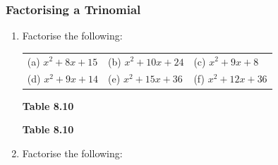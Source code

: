             \subsubsection{  Factorising a Trinomial }
            \nopagebreak
        \label{m39394*id277570}\begin{enumerate}[noitemsep, label=\textbf{\arabic*}. ] 
            \label{m39394*uid30}\item Factorise the following:
          \begin{table}[H]
        \begin{center}
      \label{m39394*id277586}
    \noindent
      \tablelasttail{}
      \begin{xtabular}[t]{|l|l|l|}\hline
        (a) ${x}^{2}+8x+15$\hspace{1ex} &
        (b) ${x}^{2}+10x+24$\hspace{1ex} &
        (c) ${x}^{2}+9x+8$\hspace{1ex}%
     \tabularnewline{}
        (d) ${x}^{2}+9x+14$\hspace{1ex} &
        (e) ${x}^{2}+15x+36$\hspace{1ex} &
        (f) ${x}^{2}+12x+36$\hspace{1ex}%
     \tabularnewline{}
    \end{xtabular}
      \end{center}
    \begin{center}{\small\bfseries Table 8.10}\end{center}
    \begin{caption}{\small\bfseries Table 8.10}\end{caption}
\end{table}
    \par
          \label{m39394*uid31}\item Factorise the following:
\label{m39394*id277790}\begin{enumerate}[noitemsep, label=\textbf{\alph*}. ] 

\end{enumerate}
\end{enumerate}
